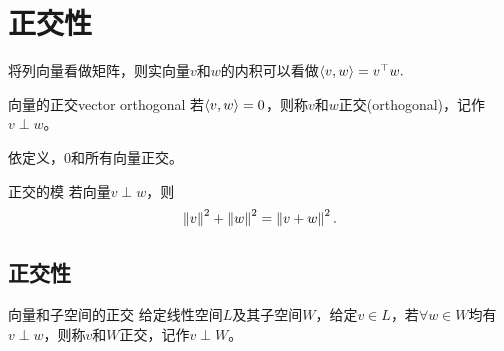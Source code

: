 \chapter{正交性}
将列向量看做矩阵，则实向量$v$和$w$的内积可以看做$\left\langle v,w\right\rangle = v^\top w.$
\begin{definition}{向量的正交}{vector orthogonal}
	若$\left\langle v,w\right\rangle=0$，则称$v$和$w$正交(orthogonal)，记作$v\perp w$。
\end{definition}
\begin{remark}
	依定义，0和所有向量正交。
\end{remark}
\begin{theorem}{正交的模}{}
	若向量$v\perp w$，则
	\begin{align}
		\left\lVert v\right\rVert^2+\left\lVert w\right\rVert^2=\left\lVert v+w\right\rVert^2.
	\end{align}
\end{theorem}

\section{正交性}

\begin{definition}
	{向量和子空间的正交}{}
	给定线性空间$L$及其子空间$W$，给定$v\in L$，若$\forall w\in W$均有$v\perp w$，则称$v$和$W$正交，记作$v\perp W$。
\end{definition}

